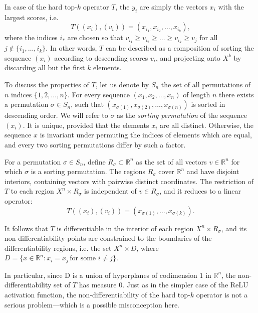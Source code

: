 \documentclass{article}
\newcommand{\RR}{\mathbb{R}}
\begin{document}
In case of the hard top-\(k\) operator \(T\), the \(y_{i}\) are simply the vectors \(x_{i}\) with the largest scores, i.e.
\begin{equation}
  T((x_{i}), (v_{i})) = (x_{i_{1}}, x_{i_{2}}, \dots, x_{i_{k}}),
\end{equation}
where the indices \(i_{*}\) are chosen so that \(v_{i_{1}}\geq v_{i_{2}} \geq \dots \geq v_{i_{k}} \geq v_{j}\) for all \(j\not\in \{i_{1}, \dots, i_{k}\}\). In other words, \(T\) can be described as a composition of sorting the sequence \((x_{i})\) according to descending scores \(v_{i}\), and projecting onto \(X^{k}\) by discarding all but the first \(k\) elements.

To discuss the properties of \(T\), let us denote by \(S_{n}\) the set of all permutations of \(n\) indices \(\{1, 2, \ldots, n\}\). For every sequence \((x_{1}, x_{2}, \dots, x_{n})\) of length \(n\) there exists a permutation \(\sigma \in S_{n}\), such that $(x_{\sigma(1)}, x_{\sigma(2)}, \dots, x_{\sigma(n)})$ is sorted in descending order. We will refer to $\sigma$ as the \emph{sorting permutation} of the sequence $(x_i)$. It is unique, provided that the elements \(x_{i}\) are all distinct. Otherwise, the sequence \(x\) is invariant under permuting the indices of elements which are equal, and every two sorting permutations differ by such a factor.

For a permutation \(\sigma\in S_{n}\), define \(R_{\sigma}\subset \RR^{n}\) as the set of all vectors \(v\in \RR^{n}\) for which \(\sigma\) is a sorting permutation. The regions \(R_{\sigma}\) cover \(\RR^{n}\) and have disjoint interiors, containing vectors with pairwise distinct coordinates. The restriction of \(T\) to each region \(X^{n}\times R_{\sigma}\) is independent of \(v\in R_{\sigma}\), and it reduces to a linear operator:
\begin{equation}
  T((x_{i}), (v_{i})) = (x_{\sigma(1)}, \dots, x_{\sigma(k)}).
\end{equation}

It follows that \(T\) is differentiable in the interior of each region \(X^{n}\times R_{\sigma}\), and its non-differentiability points are constrained to the boundaries of the differentiability regions, i.e. the set \(X^{n} \times D\), where \(D = \{x\in\RR^{n}: x_{i}=x_{j} \, \text{for some $i\ne j$}\}\).

In particular, since D is a union of hyperplanes of codimension \(1\) in \(\RR^{n}\), the non-differentiability set of \(T\) has measure \(0\). Just as in the simpler case of the \(\mathrm{ReLU}\) activation function, the non-differentiability of the hard top-\(k\) operator is not a serious problem---which is a possible misconception here.
\end{document}
